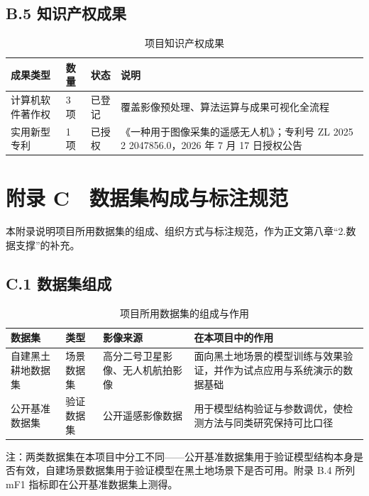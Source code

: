 \documentclass[12pt, a4paper]{ctexart}
\begin{document}
\subsection{B.5 知识产权成果}

\begin{table}[htbp]
    \centering
    \caption{项目知识产权成果}
    \label{tab:ip}
    \small
    \begin{tabular}{|p{3.4cm}|p{2.0cm}|p{3.0cm}|p{6.0cm}|}
        \hline
        \textbf{成果类型} & \textbf{数量} & \textbf{状态} & \textbf{说明} \\
        \hline
        计算机软件著作权 & 3 项 & 已登记 & 覆盖影像预处理、算法运算与成果可视化全流程 \\
        \hline
        实用新型专利 & 1 项 & 已授权 & 《一种用于图像采集的遥感无人机》；专利号 ZL 2025 2 2047856.0，2026 年 7 月 17 日授权公告 \\
        \hline
    \end{tabular}
\end{table}

\setcounter{table}{0}
\renewcommand{\thetable}{C-\arabic{table}}

\section{附录 C　数据集构成与标注规范}

本附录说明项目所用数据集的组成、组织方式与标注规范，作为正文第八章“2.数据支撑”的补充。

\subsection{C.1 数据集组成}

\begin{table}[htbp]
    \centering
    \caption{项目所用数据集的组成与作用}
    \label{tab:ds-compose}
    \small
    \begin{tabular}{|p{3.2cm}|p{2.2cm}|p{3.8cm}|p{5.2cm}|}
        \hline
        \textbf{数据集} & \textbf{类型} & \textbf{影像来源} & \textbf{在本项目中的作用} \\
        \hline
        自建黑土耕地数据集 & 场景数据集 & 高分二号卫星影像、无人机航拍影像 & 面向黑土地场景的模型训练与效果验证，并作为试点应用与系统演示的数据基础 \\
        \hline
        公开基准数据集 & 验证数据集 & 公开遥感影像数据 & 用于模型结构验证与参数调优，使检测方法与同类研究保持可比口径 \\
        \hline
    \end{tabular}
    \par\vspace{2pt}
    {\footnotesize 注：两类数据集在本项目中分工不同——公开基准数据集用于验证模型结构本身是否有效，自建场景数据集用于验证模型在黑土地场景下是否可用。附录 B.4 所列 mF1 指标即在公开基准数据集上测得。}
\end{table}
\end{document}

